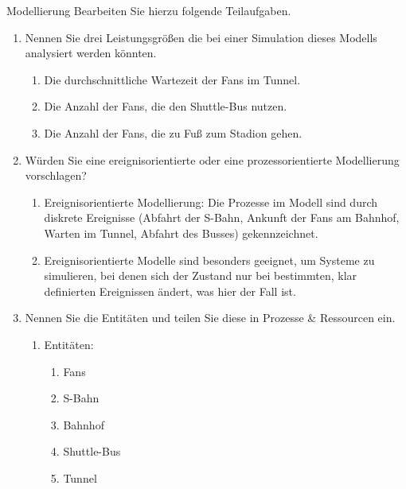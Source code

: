 \documentclass{article}
\begin{document}
\begin{exercise}{Modellierung}
  Bearbeiten Sie hierzu folgende Teilaufgaben.
  \begin{enumerate}
    \item Nennen Sie drei Leistungsgrößen die bei einer Simulation dieses Modells analysiert werden könnten.
          \begin{solution}
            \begin{enumerate}
              \item Die durchschnittliche Wartezeit der Fans im Tunnel.
              \item Die Anzahl der Fans, die den Shuttle-Bus nutzen.
              \item Die Anzahl der Fans, die zu Fuß zum Stadion gehen.
            \end{enumerate}
          \end{solution}
    \item\label{itm:empf3} Würden Sie eine ereignisorientierte oder eine prozessorientierte Modellierung vorschlagen?
          \begin{solution}
            \begin{enumerate}
              \item Ereignisorientierte Modellierung: Die Prozesse im Modell sind durch diskrete Ereignisse (Abfahrt der S-Bahn, Ankunft der Fans am Bahnhof, Warten im Tunnel, Abfahrt des Busses) gekennzeichnet.
              \item Ereignisorientierte Modelle sind besonders geeignet, um Systeme zu simulieren, bei denen sich der Zustand nur bei bestimmten, klar definierten Ereignissen ändert, was hier der Fall ist.
            \end{enumerate}
          \end{solution}
    \item\label{itm:ent3} Nennen Sie die Entitäten und teilen Sie diese in Prozesse \& Ressourcen ein.
          \begin{solution}
            \begin{enumerate}
              \item Entitäten:
                    \begin{enumerate}
                      \item Fans
                      \item S-Bahn
                      \item Bahnhof
                      \item Shuttle-Bus
                      \item Tunnel
                    \end{enumerate}

\end{enumerate}
\end{solution}
\end{enumerate}
\end{exercise}
\end{document}

